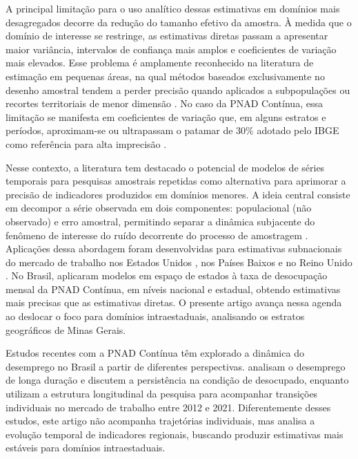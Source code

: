 \documentclass[rbe,wwwview]{econbr}
\begin{document}
A principal limitação para o uso analítico dessas estimativas em domínios mais desagregados decorre da redução do tamanho efetivo da amostra. À medida que o domínio de interesse se restringe, as estimativas diretas passam a apresentar maior variância, intervalos de confiança mais amplos e coeficientes de variação mais elevados. Esse problema é amplamente reconhecido na literatura de estimação em pequenas áreas, na qual métodos baseados exclusivamente no desenho amostral tendem a perder precisão quando aplicados a subpopulações ou recortes territoriais de menor dimensão \citep{rao2015}. No caso da PNAD Contínua, essa limitação se manifesta em coeficientes de variação que, em alguns estratos e períodos, aproximam-se ou ultrapassam o patamar de 30\% adotado pelo IBGE como referência para alta imprecisão \citep{ibgecv,ibge_estratos}.

Nesse contexto, a literatura tem destacado o potencial de modelos de séries temporais para pesquisas amostrais repetidas como alternativa para aprimorar a precisão de indicadores produzidos em domínios menores. A ideia central consiste em decompor a série observada em dois componentes: populacional (não observado) e erro amostral, permitindo separar a dinâmica subjacente do fenômeno de interesse do ruído decorrente do processo de amostragem \citep{scott1974,scott1977,smith,harvey1989}. Aplicações dessa abordagem foram desenvolvidas para estimativas subnacionais do mercado de trabalho nos Estados Unidos \citep{tiller2006}, nos Países Baixos \citep{brakel2016,boonstra2019} e no Reino Unido \citep{ons_experimental,elliott2019}. No Brasil, \citet{goncalves2022} aplicaram modelos em espaço de estados à taxa de desocupação mensal da PNAD Contínua, em níveis nacional e estadual, obtendo estimativas mais precisas que as estimativas diretas. O presente artigo avança nessa agenda ao deslocar o foco para domínios intraestaduais, analisando os estratos geográficos de Minas Gerais.

Estudos recentes com a PNAD Contínua têm explorado a dinâmica do desemprego no Brasil a partir de diferentes perspectivas. \citet{borges2024} analisam o desemprego de longa duração e discutem a persistência na condição de desocupado, enquanto \citet{guinesi2026} utilizam a estrutura longitudinal da pesquisa para acompanhar transições individuais no mercado de trabalho entre 2012 e 2021. Diferentemente desses estudos, este artigo não acompanha trajetórias individuais, mas analisa a evolução temporal de indicadores regionais, buscando produzir estimativas mais estáveis para domínios intraestaduais.
\end{document}
